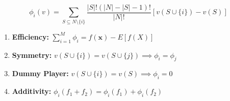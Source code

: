 \begin{tcolorbox}[colback=tealbg, colframe=tealborder, title={\textbf{Axioms of Shapley Feature Attribution}}]
\begin{equation*}
\phi_i(v) = \sum_{S \subseteq N \setminus \{i\}} \frac{|S|!(|N| - |S| - 1)!}{|N|!} \left[ v(S \cup \{i\}) - v(S) \right]
\end{equation*}
\begin{enumerate}
    \item \textbf{Efficiency:} $\sum_{i=1}^M \phi_i = f(\mathbf{x}) - E[f(X)]$
    \item \textbf{Symmetry:} $v(S \cup \{i\}) = v(S \cup \{j\}) \implies \phi_i = \phi_j$
    \item \textbf{Dummy Player:} $v(S \cup \{i\}) = v(S) \implies \phi_i = 0$
    \item \textbf{Additivity:} $\phi_i(f_1 + f_2) = \phi_i(f_1) + \phi_i(f_2)$
\end{enumerate}
\end{tcolorbox}
